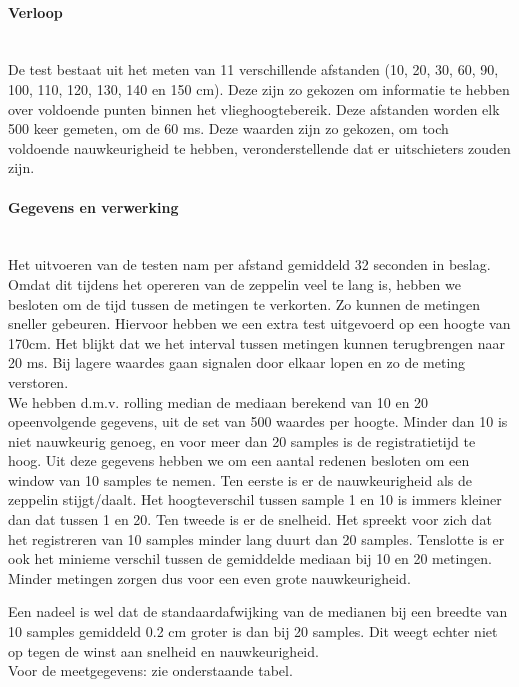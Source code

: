 \documentclass[eind]{penoverslag}
\begin{document}
\paragraph{Verloop} ~\\ 
De test bestaat uit het meten van 11 verschillende afstanden (10, 20, 30, 60, 90, 100, 110, 120, 130, 140 en 150 cm). Deze zijn zo gekozen om informatie te hebben over voldoende punten binnen het vlieghoogtebereik. Deze afstanden worden elk 500 keer gemeten, om de 60 ms. Deze waarden zijn zo gekozen, om toch voldoende nauwkeurigheid te hebben, veronderstellende dat er uitschieters zouden zijn.

\paragraph{Gegevens en verwerking} ~\\ 
Het uitvoeren van de testen nam per afstand gemiddeld 32 seconden in beslag. Omdat dit tijdens het opereren van de zeppelin veel te lang is, hebben we besloten om de tijd tussen de metingen te verkorten. Zo kunnen de metingen sneller gebeuren. Hiervoor hebben we een extra test uitgevoerd op een hoogte van 170cm. Het blijkt dat we het interval tussen metingen kunnen terugbrengen naar 20 ms. Bij lagere waardes gaan signalen door elkaar lopen en zo de meting verstoren. \\

We hebben d.m.v. rolling median de mediaan berekend van 10 en 20 opeenvolgende gegevens, uit de set van 500 waardes per hoogte. Minder dan 10 is niet nauwkeurig genoeg, en voor meer dan 20 samples is de registratietijd te hoog. Uit deze gegevens hebben we om een aantal redenen besloten om een window van 10 samples te nemen.  Ten eerste is er de nauwkeurigheid als de zeppelin stijgt/daalt. Het hoogteverschil tussen sample 1 en 10 is immers kleiner dan dat tussen 1 en 20. Ten tweede is er de snelheid. Het spreekt voor zich dat het registreren van 10 samples minder lang duurt dan 20 samples. Tenslotte is er ook het minieme verschil tussen de gemiddelde mediaan bij 10 en 20 metingen. Minder metingen zorgen dus voor een even grote nauwkeurigheid. 

Een nadeel is wel dat de standaardafwijking van de medianen bij een breedte van 10 samples gemiddeld 0.2 cm groter is dan bij 20 samples. Dit weegt echter niet op tegen de winst aan snelheid en nauwkeurigheid.\\ 

Voor de meetgegevens: zie onderstaande tabel. \\
\end{document}
